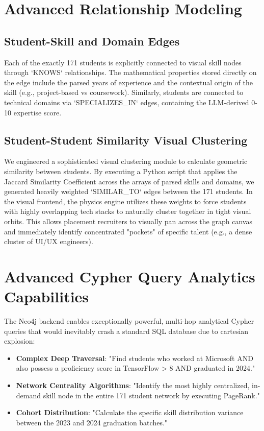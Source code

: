 \documentclass[12pt,a4paper]{report}
\begin{document}
\section{Advanced Relationship Modeling}

\subsection{Student-Skill and Domain Edges}
Each of the exactly 171 students is explicitly connected to visual skill nodes through `KNOWS` relationships. The mathematical properties stored directly on the edge include the parsed years of experience and the contextual origin of the skill (e.g., project-based vs coursework). Similarly, students are connected to technical domains via `SPECIALIZES\_IN` edges, containing the LLM-derived 0-10 expertise score.

\subsection{Student-Student Similarity Visual Clustering}
We engineered a sophisticated visual clustering module to calculate geometric similarity between students. By executing a Python script that applies the Jaccard Similarity Coefficient across the arrays of parsed skills and domains, we generated heavily weighted `SIMILAR\_TO` edges between the 171 students. In the visual frontend, the physics engine utilizes these weights to force students with highly overlapping tech stacks to naturally cluster together in tight visual orbits. This allows placement recruiters to visually pan across the graph canvas and immediately identify concentrated "pockets" of specific talent (e.g., a dense cluster of UI/UX engineers).

\section{Advanced Cypher Query Analytics Capabilities}

The Neo4j backend enables exceptionally powerful, multi-hop analytical Cypher queries that would inevitably crash a standard SQL database due to cartesian explosion:
\begin{itemize}
    \item \textbf{Complex Deep Traversal}: "Find students who worked at Microsoft AND also possess a proficiency score in TensorFlow > 8 AND graduated in 2024."
    \item \textbf{Network Centrality Algorithms}: "Identify the most highly centralized, in-demand skill node in the entire 171 student network by executing PageRank."
    \item \textbf{Cohort Distribution}: "Calculate the specific skill distribution variance between the 2023 and 2024 graduation batches."
\end{itemize}
\end{document}
